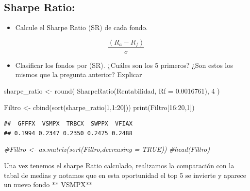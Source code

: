\documentclass[
  12pt,
]{article}
\newenvironment{Shaded}{\begin{snugshade}}{\end{snugshade}}
\newcommand{\AttributeTok}[1]{\textcolor[rgb]{0.77,0.63,0.00}{#1}}
\newcommand{\CommentTok}[1]{\textcolor[rgb]{0.56,0.35,0.01}{\textit{#1}}}
\newcommand{\DecValTok}[1]{\textcolor[rgb]{0.00,0.00,0.81}{#1}}
\newcommand{\FloatTok}[1]{\textcolor[rgb]{0.00,0.00,0.81}{#1}}
\newcommand{\FunctionTok}[1]{\textcolor[rgb]{0.00,0.00,0.00}{#1}}
\newcommand{\NormalTok}[1]{#1}
\newcommand{\OtherTok}[1]{\textcolor[rgb]{0.56,0.35,0.01}{#1}}
\newcommand{\SpecialCharTok}[1]{\textcolor[rgb]{0.00,0.00,0.00}{#1}}
\providecommand{\tightlist}{%
  \setlength{\itemsep}{0pt}\setlength{\parskip}{0pt}}
\begin{document}
\hypertarget{sharpe-ratio}{%
\subsection{Sharpe Ratio:}\label{sharpe-ratio}}

\begin{itemize}
\tightlist
\item
  Calcule el Sharpe Ratio (SR) de cada fondo.
\end{itemize}

\[
\frac{(R_{a}-R_{f})}{\sigma }
\]

\begin{itemize}
\tightlist
\item
  Clasificar los fondos por (SR). ¿Cuáles son los 5 primeros? ¿Son estos
  los mismos que la pregunta anterior? Explicar
\end{itemize}

\begin{Shaded}
\begin{Highlighting}[]
\NormalTok{sharpe\_ratio }\OtherTok{\textless{}{-}} \FunctionTok{round}\NormalTok{(}
  \FunctionTok{SharpeRatio}\NormalTok{(Rentabilidad, }\AttributeTok{Rf =} \FloatTok{0.0016761}\NormalTok{), }\DecValTok{4}
\NormalTok{)}

\NormalTok{Filtro }\OtherTok{\textless{}{-}} \FunctionTok{cbind}\NormalTok{(}\FunctionTok{sort}\NormalTok{(sharpe\_ratio[}\DecValTok{1}\NormalTok{,}\DecValTok{1}\SpecialCharTok{:}\DecValTok{20}\NormalTok{]))}
\FunctionTok{print}\NormalTok{(Filtro[}\DecValTok{16}\SpecialCharTok{:}\DecValTok{20}\NormalTok{,}\DecValTok{1}\NormalTok{])}
\end{Highlighting}
\end{Shaded}

\begin{verbatim}
##  GFFFX  VSMPX  TRBCX  SWPPX  VFIAX 
## 0.1994 0.2347 0.2350 0.2475 0.2488
\end{verbatim}

\begin{Shaded}
\begin{Highlighting}[]
\CommentTok{\#Filtro \textless{}{-} as.matrix(sort(Filtro,decreasing = TRUE))}
\CommentTok{\#head(Filtro)}
\end{Highlighting}
\end{Shaded}

Una vez tenemos el sharpe Ratio calculado, realizamos la comparación con
la tabal de medias y notamos que en esta oportunidad el top 5 se
invierte y aparece un nuevo fondo ** VSMPX**
\end{document}
